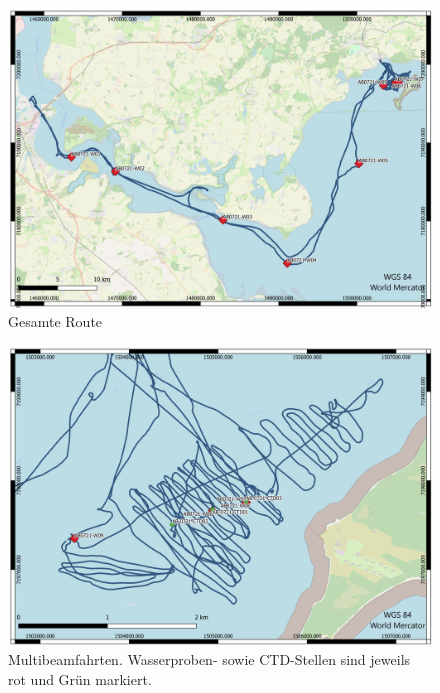 \begin{figure}[]
    \centering
    \includegraphics[width=1\linewidth]{Bilder/QGIS/Gesamte_route.png}
    \caption{Gesamte Route}
    \label{fig:route}
\end{figure}
\begin{figure}
    \centering
    \includegraphics[width=1\linewidth]{Bilder/QGIS/multibeam.png}
    \caption{Multibeamfahrten. Wasserproben- sowie CTD-Stellen sind jeweils rot und Grün markiert.}
    \label{fig:multibeam_route}
\end{figure}